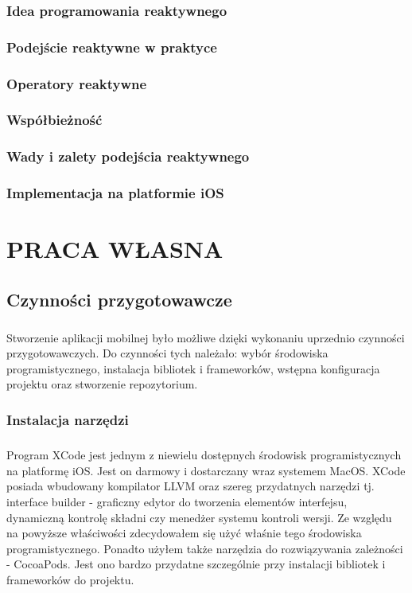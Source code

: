 \documentclass[11pt,twoside,a4paper]{report}
\begin{document}
\subsection{Idea programowania reaktywnego}
\subsection{Podejście reaktywne w praktyce}
\subsection{Operatory reaktywne}
\subsection{Współbieżność}
\subsection{Wady i zalety podejścia reaktywnego} 
\subsection{Implementacja na platformie iOS}
\chapter{PRACA WŁASNA}
\section{Czynności przygotowawcze}		
\paragraph{}Stworzenie aplikacji mobilnej było możliwe dzięki wykonaniu uprzednio czynności przygotowawczych. Do czynności tych należało: wybór środowiska programistycznego, instalacja bibliotek i frameworków, wstępna konfiguracja projektu oraz stworzenie repozytorium.
\subsection{Instalacja narzędzi}
\paragraph{}Program XCode jest jednym z niewielu dostępnych środowisk programistycznych na platformę iOS. Jest on darmowy i dostarczany wraz systemem MacOS. XCode posiada wbudowany kompilator LLVM oraz szereg przydatnych narzędzi tj. interface builder - graficzny edytor do tworzenia elementów interfejsu, dynamiczną kontrolę składni czy menedżer systemu kontroli wersji. Ze względu na powyższe właściwości zdecydowałem się użyć właśnie tego środowiska programistycznego.
Ponadto użyłem także narzędzia do rozwiązywania zależności - CocoaPods. Jest ono bardzo przydatne szczególnie przy instalacji bibliotek i frameworków do projektu.  
\end{document}
